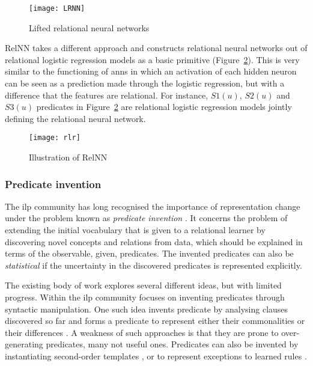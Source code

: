 \begin{figure}
	\medskip
	\centering
	\texttt{[image: LRNN]}
	\label{fig:lrnn}
	\caption{Lifted relational neural networks}
\end{figure}


RelNN takes a different approach and constructs relational neural networks out of relational logistic regression models as a basic primitive (Figure~\ref{fig:relnn}).
This is very similar to the functioning of \gls{ann}s in which an activation of each hidden neuron can be seen as a prediction made through the logistic regression, but with a difference that the features are relational.
For instance, $S1(u)$, $S2(u)$ and $S3(u)$ predicates in Figure~\ref{fig:relnn} are relational logistic regression models jointly defining the relational neural network.



\begin{figure}
	\centering
	\texttt{[image: rlr]}
	\caption{Illustration of RelNN\label{fig:relnn}}
\end{figure}




\subsubsection{Predicate invention}

The \gls{ilp} community has long recognised the importance of representation change under the problem known as \textit{predicate invention} \cite{Kramer1995}.
It concerns the problem of extending the initial vocabulary that is given to a relational learner by discovering novel concepts and relations from data, which should be explained in terms of the observable, given, predicates.
The invented predicates can also be \textit{statistical} if the uncertainty in the discovered predicates is represented explicitly.


The existing body of work explores several different ideas, but with limited progress.
Within the \gls{ilp} community focuses on inventing predicates through syntactic manipulation.
One such idea invents predicate by analysing clauses discovered so far and forms a predicate to represent either their commonalities \cite{Wogulis1989} or their differences \cite{MuggletonBu88}.
A weakness of such approaches is that they are prone to over-generating predicates, many not useful ones.
Predicates can also be invented by instantiating second-order templates \cite{Silverstein91}, or to represent exceptions to learned rules \cite{Srinivasan92}.

